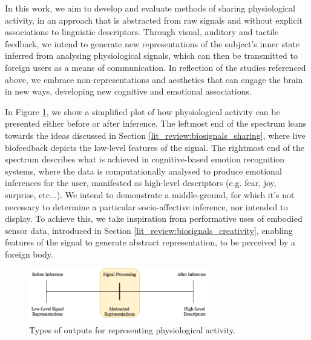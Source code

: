 In this work, we aim to develop and evaluate methods of sharing physiological activity, in an approach that is abstracted from raw signals and without explicit associations to linguistic descriptors. Through visual, auditory and tactile feedback, we intend to generate new representations of the subject's inner state inferred from analysing physiological signals, which can then be transmitted to foreign users as a means of communication. In reflection of the studies referenced above, we embrace non-representations and aesthetics that can engage the brain in new ways, developing new cognitive and emotional associations.

In Figure \ref{fig:Abstracted_Representations}, we show a simplified plot of how physiological activity can be presented either before or after inference. The leftmost end of the spectrum leans towards the ideas discussed in Section \ref{lit_review:biosignals_sharing}, where live biofeedback depicts the low-level features of the signal. The rightmost end of the spectrum describes what is achieved in cognitive-based emotion recognition systems, where the data is computationally analysed to produce emotional inferences for the user, manifested as high-level descriptors (e.g. fear, joy, surprise, etc...). We intend to demonstrate a middle-ground, for which it's not necessary to determine a particular socio-affective inference, nor intended to display. To achieve this, we take inspiration from performative uses of embodied sensor data, introduced in Section \ref{lit_review:biosignals_creativity}, enabling features of the signal to generate abstract representation, to be perceived by a foreign body.

\begin{figure}[htbp]
	\centering
	\includegraphics[width=0.7\textwidth]{Chapters/Figures/Abstracted_Representations.png}
	\caption{Types of outputs for representing physiological activity.}
	\label{fig:Abstracted_Representations}
\end{figure}

